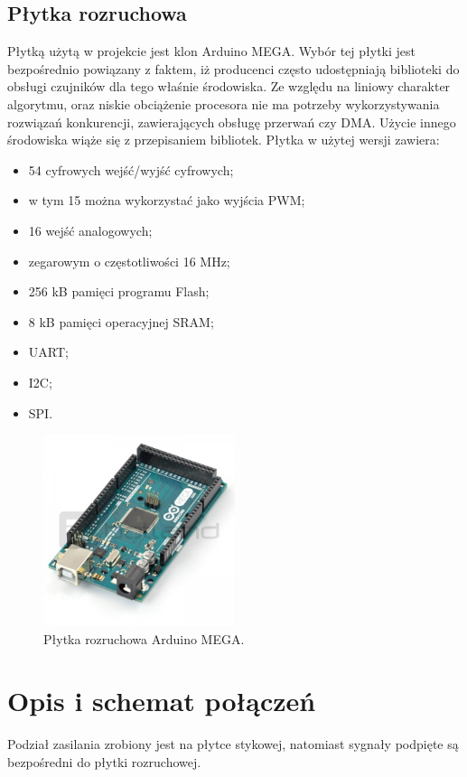 \subsection{Płytka rozruchowa}
Płytką użytą w projekcie jest klon Arduino MEGA. Wybór tej płytki jest bezpośrednio powiązany z faktem, iż producenci często udostępniają biblioteki do obsługi czujników dla tego właśnie środowiska. Ze względu na liniowy charakter algorytmu, oraz niskie obciążenie procesora nie ma potrzeby wykorzystywania rozwiązań konkurencji, zawierających obsługę przerwań czy DMA. Użycie innego środowiska wiąże się z przepisaniem bibliotek. Płytka w użytej wersji zawiera:
\begin{itemize}
    \item 54 cyfrowych wejść/wyjść cyfrowych;
    \item w tym 15 można wykorzystać jako wyjścia PWM;
    \item 16 wejść analogowych;
    \item zegarowym o częstotliwości 16 MHz;
    \item 256 kB pamięci programu Flash;
    \item 8 kB pamięci operacyjnej SRAM;
    \item UART;
    \item I2C;
    \item SPI.
\end{itemize}
\begin{figure}[H]
\centering
\includegraphics[width=0.5\textwidth]{inzynierku/img/arduino.jpg}
\caption{\label{fig:Arduino_MEGA}Płytka rozruchowa Arduino MEGA.}
\end{figure}

\section{Opis i schemat połączeń}
Podział zasilania zrobiony jest na płytce stykowej, natomiast sygnały podpięte są bezpośredni do płytki rozruchowej.

